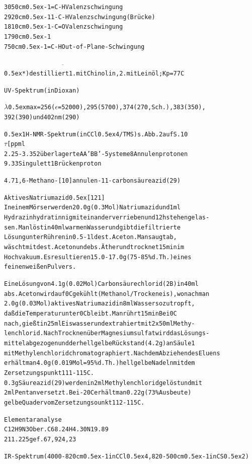 \documentclass[a4paper,11pt]{article}
\begin{document}
\begin{alltt}

3050 cm\raise0.5ex\hbox{-1}   =C-H    Valenzschwingung
2920 cm\raise0.5ex\hbox{-1}1  -C-H    Valenzschwingung (Brücke)
1810 cm\raise0.5ex\hbox{-1}   -C=O    Valenzschwingung
1790 cm\raise0.5ex\hbox{-1}
 750 cm\raise0.5ex\hbox{-1}   =C-H    Out-of-Plane-Schwingung

\(\overline{\hspace{7cm}}\)
\leavevmode\raise0.5ex\hbox{*}) destilliert 1. mit Chinolin, 2. mit Leinöl; Kp = 77\degree{}C

\newpage
{}


UV-Spektrum (in Dioxan)

\(\lambda\)\lower0.5ex\hbox{max} = 256 (\(\epsilon\) = 52000), 295 (5700), 374 (270, Sch.), 383 (350),
392 (390) und 402 nm (290)

\leavevmode\raise0.5ex\hbox{1}H-NMR-Spektrum (in CCl\lower0.5ex\hbox{4}/TMS) s. Abb. 2 auf S. 10
  \(\tau\) [ppml
2.25 - 3.35 2 überlagerte AA'BB'-5ysteme   8 Annulenprotonen
9.33        Singulett                      1 Brückenproton

4.7 1,6-Methano-[10]annulen-11-carbonsäureazid (29)

Aktives Natriumazid \raise0.5ex\hbox{[121]}
In einem Mörser werden 20.0 g (0.3 Mol) Natriumazid und 1 ml
Hydrazinhydrat innig miteinander verrieben und 12 h stehen gelas-
sen. Man löst in 40 ml warmen Wasser und gibt die filtrierte
Lösung unter Rühren in 0.5 - 1 l dest. Aceton. Man saugt ab,
wäscht mit dest. Aceton und ebs. Äther und trocknet 15 min im
Hochvakuum. Es resultieren 15.0 - 17.0 g (75 - 85 \% d.Th.) eines
feinen weißen Pulvers.

Eine Lösung von 4.1 g (0.02 Mol) Carbonsäurechlorid (2B) in 40 ml
abs. Aceton wird auf 0\degree{}C gekühlt (Methanol/Trockeneis), wonach man
2.0 g (0.03 Mol) aktives Natriumazid in 8 ml Wasser so zutropft,
daß die Temperatur unter 0\degree{}C bleibt. Man rührt 15 min Bei 0\degree{}C
nach, gießt in 25 ml Eiswasser und extrahiert mit 2 x 50 ml Methy-
lenchlorid. Nach Trocknen über Magnesiumsulfat wird das Lösungs-
mittel abgezogen und der hellgelbe Rückstand (4.2 g) an Säule 1
mit Methylenchlorid chromatographiert. Nach dem Abziehen des Eluens
erhält man 4.0 g (0.019 Mol = 95 \% d.Th.) hellgelbe Nadeln mit dem
Zersetzungspunkt 111 - 115\degree{}C.
0.3 g Säureazid (29) werden in 2 ml Methylenchlorid gelöst und mit
2 ml Pentan versetzt. Bei -20\degree{}C erhält man 0.22 g (73 \% Ausbeute)
gelbe Quader vom Zersetzungsounkt 112 - 115\degree{}C.

\newpage
{}


Elementaranalyse
C12H9N3O     ber.   C  68.24   H  4.30   N  19.89
211.225      gef.      67,92      4,23      


IR-Spektrum (4000-820 cm\raise0.5ex\hbox{-1} in CCl\lower0.5ex\hbox{4}, 820-500 cm\raise0.5ex\hbox{-1} in CS\lower0.5ex\hbox{2})
\end{alltt}
\end{document}
